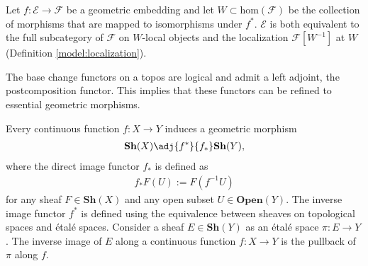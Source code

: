     \begin{property}\label{topos:characterization_embedding}
        Let $f:\mathcal{E}\rightarrow\mathcal{F}$ be a geometric embedding and let $W\subset\mathrm{hom}(\mathcal{F})$ be the collection of morphisms that are mapped to isomorphisms under $f^*$. $\mathcal{E}$ is both equivalent to the full subcategory of $\mathcal{F}$ on $W$-local objects and the localization $\mathcal{F}[W^{-1}]$ at $W$ (Definition \ref{model:localization}).
    \end{property}

    \begin{property}
        The base change functors on a topos are logical and admit a left adjoint, the postcomposition functor. This implies that these functors can be refined to essential geometric morphisms.
    \end{property}

    \begin{example}\label{topos:topological_spaces}
        Every continuous function $f:X\rightarrow Y$ induces a geometric morphism
        \begin{gather}
            \mathbf{Sh}(X)\adj{f^*}{f_*}\mathbf{Sh}(Y),
        \end{gather}
        where the direct image functor $f_*$ is defined as
        \begin{gather}
            f_*F(U) := F(f^{-1}U)
        \end{gather}
        for any sheaf $F\in\mathbf{Sh}(X)$ and any open subset $U\in\mathbf{Open}(Y)$. The inverse image functor $f^*$ is defined using the equivalence between sheaves on topological spaces and \'etal\'e spaces. Consider a sheaf $E\in\mathbf{Sh}(Y)$ as an \'etal\'e space $\pi:E\rightarrow Y$. The inverse image of $E$ along a continuous function $f:X\rightarrow Y$ is the pullback of $\pi$ along $f$.
    \end{example}

